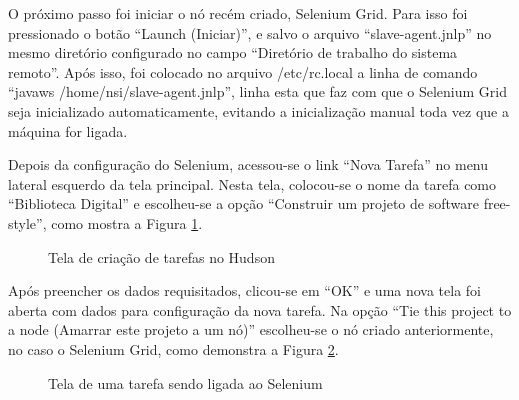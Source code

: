 O próximo passo foi iniciar o nó recém criado, Selenium Grid. Para isso foi pressionado o botão ``Launch (Iniciar)'', e salvo o arquivo ``slave-agent.jnlp'' no mesmo diretório configurado no campo ``Diretório de trabalho do sistema remoto''. Após isso, foi colocado no arquivo /etc/rc.local a linha de comando ``javaws /home/nsi/slave-agent.jnlp'', linha esta que faz com que o Selenium Grid seja inicializado automaticamente, evitando a inicialização manual toda vez que a máquina for ligada.

Depois da configuração do Selenium, acessou-se o link ``Nova Tarefa'' no menu lateral esquerdo da tela principal. Nesta tela, colocou-se o nome da tarefa como ``Biblioteca Digital'' e escolheu-se a opção ``Construir um projeto de software free-style'', como mostra a Figura \ref{hudson_nova_tarefa}.

\begin{figure}[ht]
    \centering
    \caption{Tela de criação de tarefas no Hudson}
    \label{hudson_nova_tarefa}
\end{figure}

Após preencher os dados requisitados, clicou-se em ``OK'' e uma nova tela foi aberta com dados para configuração da nova tarefa. Na opção ``Tie this project to a node (Amarrar este projeto a um nó)'' escolheu-se o nó criado anteriormente, no caso o Selenium Grid, como demonstra a Figura \ref{configuracao_tarefa_selenium}.

\begin{figure}[ht]
    \centering
    \caption{Tela de uma tarefa sendo ligada ao Selenium}
    \label{configuracao_tarefa_selenium}
\end{figure}

